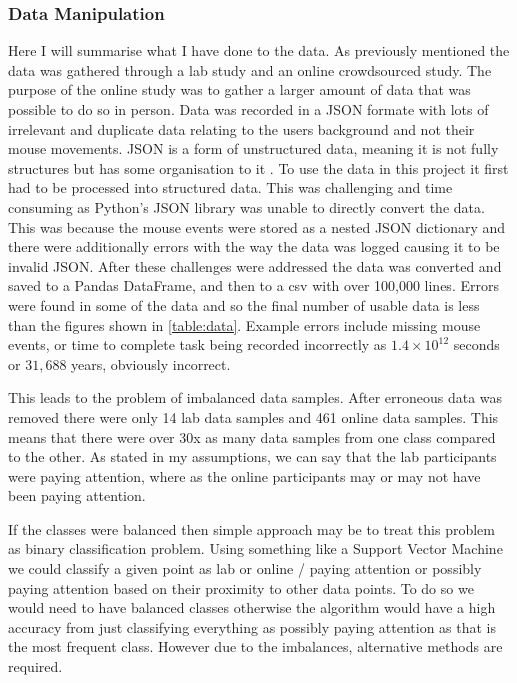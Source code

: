 \documentclass{article}
\begin{document}


\subsubsection{Data Manipulation}

Here I will summarise what I have done to the data.
As previously mentioned the data was gathered through a lab study and an online crowdsourced study.
The purpose of the online study was to gather a larger amount of data that was possible to do so in person.
Data was recorded in a JSON formate with lots of irrelevant and duplicate data relating to the users background and not their mouse movements.
JSON is a form of unstructured data, meaning it is not fully structures but has some organisation to it \cite{ronk2014structured}.
To use the data in this project it first had to be processed into structured data.
This was challenging and time consuming as Python's JSON library was unable to directly convert the data.
This was because the mouse events were stored as a nested JSON dictionary and there were additionally errors with the way the data was logged causing it to be invalid JSON.
After these challenges were addressed the data was converted and saved to a Pandas DataFrame, and then to a csv with over 100,000 lines.
Errors were found in some of the data and so the final number of usable data is less than the figures shown in \ref{table:data}.
Example errors include missing mouse events, or time to complete task being recorded incorrectly as 
$1.4 \times 10^{12}$ seconds or $31,688$ years, obviously incorrect.

This leads to the problem of imbalanced data samples.
After erroneous data was removed there were only 14 lab data samples and 461 online data samples.
This means that there were over 30x as many data samples from one class compared to the other.
As stated in my assumptions, we can say that the lab participants were paying attention, where as the online participants may or may not have been paying attention.

If the classes were balanced then simple approach may be to treat this problem as binary classification problem.
Using something like a Support Vector Machine we could classify a given point as lab or online / paying attention or possibly paying attention based on their proximity to other data points.
To do so we would need to have balanced classes otherwise the algorithm would have a high accuracy from just classifying everything as possibly paying attention as that is the most frequent class.
However due to the imbalances, alternative methods are required.
\end{document}

